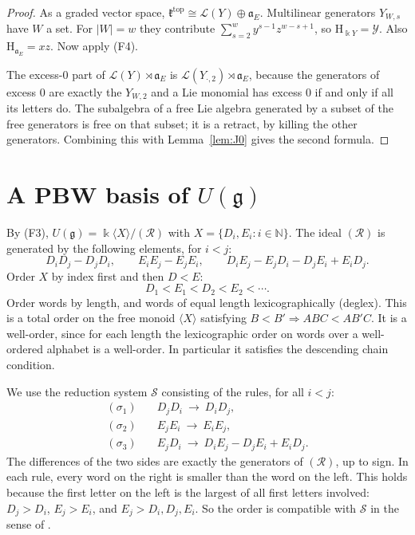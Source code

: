\documentclass[11pt]{amsart}
\theoremstyle{definition}
\theoremstyle{remark}
\newcommand{\N}{\mathbb{N}}
\newcommand{\kk}{\Bbbk}
\newcommand{\g}{\mathfrak{g}}
\newcommand{\ktop}{\mathfrak{k}^{\mathrm{top}}}
\newcommand{\af}{\mathfrak{a}}
\newcommand{\Lf}{\mathcal{L}}
\newcommand{\Hs}{\mathrm{H}}
\begin{document}
\begin{proof}
As a graded vector space, $\ktop\cong\Lf(Y)\oplus\af_E$. Multilinear generators $Y_{W,s}$ have $W$ a set. For $|W|=w$ they contribute $\sum_{s=2}^wy^{s-1}z^{w-s+1}$, so $\Hs_{\kk Y}=\mathcal Y$. Also $\Hs_{\af_E}=xz$. Now apply (F4).

The excess-$0$ part of $\Lf(Y)\rtimes\af_E$ is $\Lf(Y_{\cdot,2})\rtimes\af_E$, because the generators of excess $0$ are exactly the $Y_{W,2}$ and a Lie monomial has excess $0$ if and only if all its letters do. The subalgebra of a free Lie algebra generated by a subset of the free generators is free on that subset; it is a retract, by killing the other generators. Combining this with Lemma~\ref{lem:J0} gives the second formula.
\end{proof}

\section{A PBW basis of \texorpdfstring{$U(\g)$}{U(g)}}\label{sec:pbw}

By (F3), $U(\g)=\kk\langle X\rangle/(\mathcal R)$ with $X=\{D_i,E_i:i\in\N\}$. The ideal $(\mathcal R)$ is generated by the following elements, for $i<j$:
\[
D_iD_j-D_jD_i,\qquad E_iE_j-E_jE_i,\qquad D_iE_j-E_jD_i-D_jE_i+E_iD_j.
\]
Order $X$ by index first and then $D<E$:
\[
D_1<E_1<D_2<E_2<\cdots.
\]
Order words by length, and words of equal length lexicographically (deglex). This is a total order on the free monoid $\langle X\rangle$ satisfying $B<B'\Rightarrow ABC<AB'C$. It is a well-order, since for each length the lexicographic order on words over a well-ordered alphabet is a well-order. In particular it satisfies the descending chain condition.

We use the reduction system $\mathcal S$ consisting of the rules, for all $i<j$:
\begin{align*}
(\sigma_1)\quad & D_jD_i\ \to\ D_iD_j,\\
(\sigma_2)\quad & E_jE_i\ \to\ E_iE_j,\\
(\sigma_3)\quad & E_jD_i\ \to\ D_iE_j-D_jE_i+E_iD_j.
\end{align*}
The differences of the two sides are exactly the generators of $(\mathcal R)$, up to sign. In each rule, every word on the right is smaller than the word on the left. This holds because the first letter on the left is the largest of all first letters involved: $D_j>D_i$, $E_j>E_i$, and $E_j>D_i,D_j,E_i$. So the order is compatible with $\mathcal S$ in the sense of \cite[\S1]{Ber}.
\end{document}
